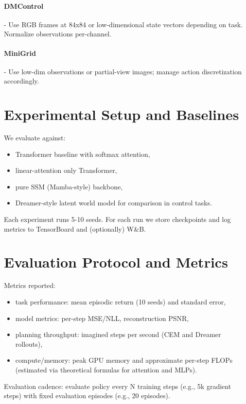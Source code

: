 \documentclass{article}
\begin{document}
\paragraph{DMControl}
- Use RGB frames at 84x84 or low-dimensional state vectors depending on task. Normalize observations per-channel.

\paragraph{MiniGrid}
- Use low-dim observations or partial-view images; manage action discretization accordingly.

\section{Experimental Setup and Baselines}
We evaluate against:
\begin{itemize}
  \item Transformer baseline with softmax attention,
  \item linear-attention only Transformer,
  \item pure SSM (Mamba-style) backbone,
  \item Dreamer-style latent world model for comparison in control tasks.
\end{itemize}
Each experiment runs 5-10 seeds. For each run we store checkpoints and log metrics to TensorBoard and (optionally) W&B.

\section{Evaluation Protocol and Metrics}
Metrics reported:
\begin{itemize}
  \item task performance: mean episodic return (10 seeds) and standard error,
  \item model metrics: per-step MSE/NLL, reconstruction PSNR,
  \item planning throughput: imagined steps per second (CEM and Dreamer rollouts),
  \item compute/memory: peak GPU memory and approximate per-step FLOPs (estimated via theoretical formulas for attention and MLPs).
\end{itemize}
Evaluation cadence: evaluate policy every N training steps (e.g., 5k gradient steps) with fixed evaluation episodes (e.g., 20 episodes).
\end{document}
